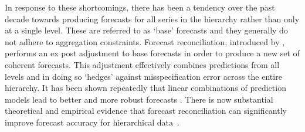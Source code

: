 \documentclass[a4paper,fleqn,11pt]{article}
\begin{document}
In response to these shortcomings, there has been a tendency over the past decade towards producing forecasts for all series in the hierarchy rather than only at a single level. These are referred to as `base' forecasts and they generally do not adhere to aggregation constraints. Forecast reconciliation, introduced by \cite{Hyndman2011}, performs an ex post adjustment to base forecasts in order to produce a new set of coherent forecasts. This adjustment effectively combines predictions from all levels and in doing so `hedges' against misspecification error across the entire hierarchy. It has been shown repeatedly that linear combinations of prediction models lead to better and more robust forecasts \citep[see for instance][]{Stock2006,Conflitti2015}. There is now substantial theoretical and empirical evidence that forecast reconciliation can significantly improve forecast accuracy for hierarchical data~\citep[see][and references therein]{Wickramasuriya2015}.
\end{document}
